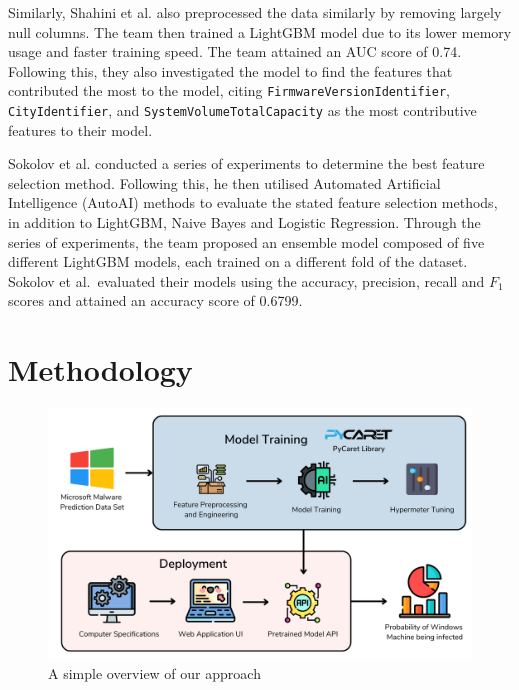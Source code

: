 \documentclass[pdflatex,sn-basic,Numbered]{sn-jnl}%
\theoremstyle{thmstyleone}%
\theoremstyle{thmstyletwo}%
\theoremstyle{thmstylethree}%
\begin{document}
Similarly, Shahini et al. \cite{shahini2019} also preprocessed the data similarly by removing largely null columns.
The team then trained a LightGBM model due to its lower memory usage and faster training speed.
The team attained an AUC score of 0.74.
Following this, they also investigated the model to find the features that contributed the most to the model, citing \texttt{FirmwareVersionIdentifier}, \texttt{CityIdentifier},  and \texttt{SystemVolumeTotalCapacity} as the most contributive features to their model.

Sokolov et al. \cite{sokolov2021} conducted a series of experiments to determine the best feature selection method.
Following this, he then utilised Automated Artificial Intelligence (AutoAI) methods to evaluate the stated feature selection methods, in addition to LightGBM, Naive Bayes and Logistic Regression.
Through the series of experiments, the team proposed an ensemble model composed of five different LightGBM models, each trained on a different fold of the dataset.
Sokolov et al.\ evaluated their models using the accuracy, precision, recall and $F_1$ scores and attained an accuracy score of 0.6799.

\section{Methodology}\label{sec:methodology}

\begin{figure}[h]
\includegraphics[scale=0.25]{images/mmp_diagram}
\centering
\caption{A simple overview of our approach}
\label{fig:fig-1}
\end{figure}
\end{document}
